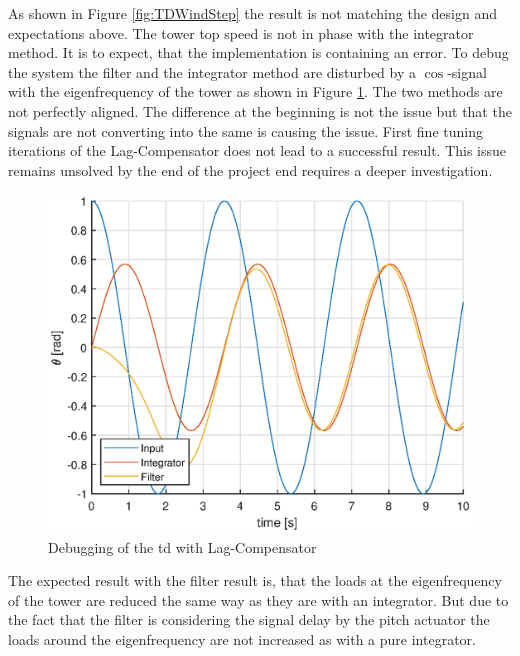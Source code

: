 As shown in Figure \ref{fig:TDWindStep} the result is not matching the design and expectations above. 
The tower top speed is not in phase with the integrator method. It is to expect, that the implementation is containing an error.
To debug the system the filter and the integrator method are disturbed by a $\cos$-signal with the eigenfrequency of the tower as shown in Figure \ref{fig:Debug}. 
The two methods are not perfectly aligned. 
The difference at the beginning is not the issue but that the signals are not converting into the same is causing the issue. 
First fine tuning iterations of the Lag-Compensator does not lead to a successful result. 
This issue remains unsolved by the end of the project end requires a deeper investigation. 
 
\begin{figure}[h]
	\centering	
	\includegraphics[width=12cm]{Figures/Debugging.eps}
	\caption{Debugging of the \gls{td} with Lag-Compensator}
	\label{fig:Debug}
\end{figure}
  
The expected result with the filter result is, that the loads at the eigenfrequency of the tower are reduced the same way as they are with an integrator.
But due to the fact that the filter is considering the signal delay by the pitch actuator the loads around the eigenfrequency are not increased as with a pure integrator.    